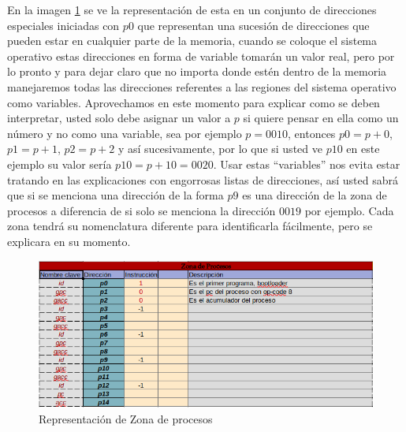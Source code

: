 \documentclass[12pt]{article}
\begin{document}
	En la imagen \ref{fig:zprocesos} se ve la representación
	de esta en un conjunto de direcciones especiales iniciadas con $p0$ que representan una sucesión de direcciones
	que pueden estar en cualquier parte de la memoria, cuando se coloque el sistema operativo estas direcciones en forma de variable
	tomarán un valor real, pero por lo pronto y para dejar claro que no importa donde estén dentro de la memoria
	manejaremos todas las direcciones referentes a las regiones del sistema operativo como variables. Aprovechamos en este
	momento para explicar como se deben interpretar, usted solo debe asignar un valor a $p$ si quiere pensar en ella
	como un número y no como una variable, sea por ejemplo $p=0010$, entonces $p0=p+0$, $p1=p+1$, $p2=p+2$ y así sucesivamente, por
	lo que si usted ve $p10$ en este ejemplo su valor sería $p10=p+10=0020$. Usar estas ``variables'' nos evita estar tratando en
	las explicaciones con engorrosas listas de direcciones, así usted sabrá que si se menciona una dirección de la forma $p9$ es
	una dirección de la zona de procesos a diferencia de si solo se menciona la dirección $0019$ por ejemplo. Cada zona tendrá su
	nomenclatura diferente para identificarla fácilmente, pero se explicara en su momento.
	\begin{figure}[h]
		\centering
		\includegraphics[scale=0.5]{media/Zona_procesos} 
		\caption{Representación de Zona de procesos}
		\label{fig:zprocesos}
	\end{figure}
	
\end{document}
